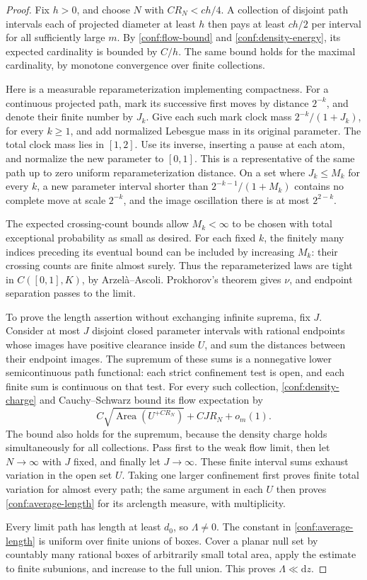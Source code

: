 \documentclass[11pt]{article}
\numberwithin{equation}{section}
\theoremstyle{definition}
\theoremstyle{remark}
\newcommand{\1}{\mathbf 1}
\begin{document}
\begin{proof}
Fix \(h>0\), and choose \(N\) with \(CR_N<ch/4\).  A collection
of disjoint path intervals each of projected diameter at least \(h\)
then pays at least \(ch/2\) per interval for all sufficiently large
\(m\).  By \eqref{conf:flow-bound} and
\eqref{conf:density-energy}, its expected cardinality is bounded by
\(C/h\).  The same bound holds for the maximal cardinality, by
monotone convergence over finite collections.

Here is a measurable reparameterization implementing compactness.
For a continuous projected path, mark its successive first moves by
distance \(2^{-k}\), and denote their finite number by \(J_k\).
Give each such mark clock mass \(2^{-k}/(1+J_k)\), for every
\(k\ge1\), and add normalized Lebesgue mass in its original
parameter.  The total clock mass lies in \([1,2]\).  Use its inverse,
inserting a pause at each atom, and normalize the new parameter to
\([0,1]\).  This is a representative of the same path up to zero
uniform reparameterization distance.  On a set where \(J_k\le M_k\)
for every \(k\), a new parameter interval shorter than
\(2^{-k-1}/(1+M_k)\) contains no complete move at scale \(2^{-k}\),
and the image oscillation there is at most \(2^{2-k}\).

The expected crossing-count bounds allow \(M_k<\infty\) to be
chosen with total exceptional probability as small as desired.  For
each fixed \(k\), the finitely many indices preceding its eventual
bound can be included by increasing \(M_k\): their crossing counts
are finite almost surely.  Thus the reparameterized laws are tight
in \(C([0,1],K)\), by Arzel\`a--Ascoli.  Prokhorov's theorem gives
\(\nu\), and endpoint separation passes to the limit.

To prove the length assertion without exchanging infinite suprema,
fix \(J\).  Consider at most \(J\) disjoint closed parameter intervals
with rational endpoints whose images have positive clearance inside
\(U\), and sum the distances between their endpoint images.  The
supremum of these sums is a nonnegative lower semicontinuous path
functional: each strict confinement test is open, and each finite sum
is continuous on that test.  For every such collection,
\eqref{conf:density-charge} and Cauchy--Schwarz bound its flow
expectation by
\[
 C\sqrt{\operatorname{Area}(U^{+CR_N})}+CJR_N+o_m(1).
\]
The bound also holds for the supremum, because the density charge
holds simultaneously for all collections.  Pass first to the weak
flow limit, then let \(N\to\infty\) with \(J\) fixed, and finally
let \(J\to\infty\).  These finite interval sums exhaust variation
in the open set \(U\).  Taking one larger confinement first proves
finite total variation for almost every path; the same argument in
each \(U\) then proves \eqref{conf:average-length} for its arclength
measure, with multiplicity.

Every limit path has length at least \(d_0\), so \(\Lambda\ne0\).
The constant in \eqref{conf:average-length} is uniform over finite
unions of boxes.  Cover a planar null set by countably many rational
boxes of arbitrarily small total area, apply the estimate to finite
subunions, and increase to the full union.  This proves
\(\Lambda\ll\mathrm d z\).
\end{proof}
\end{document}
